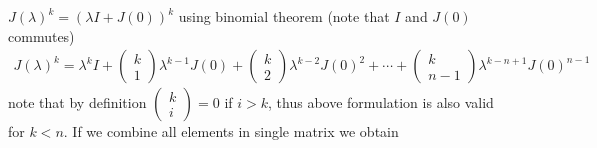 \documentclass[twoside]{article}
\begin{document}
$J(\lambda)^k = \left( \lambda I +  J(0)\right)^k$ using binomial theorem (note that $I$ and $J(0)$ commutes)
%
\begin{align*}
	J(\lambda)^k = \lambda^k I + \left( \begin{array}{c} k \\ 1 \end{array} \right) \lambda^{k-1} J(0) + 
	\left( \begin{array}{c} k \\ 2 \end{array} \right) \lambda^{k-2} J(0)^2 + \cdots + 
	\left( \begin{array}{c} k \\ n-1 \end{array} \right) \lambda^{k-n+1} J(0)^{n-1} 
\end{align*}
% 
note that by definition $\left( \begin{array}{c} k \\ i \end{array} \right) = 0 $ if $i > k$, thus above formulation is also valid for $k < n$. If we combine 
all elements in single matrix we obtain
%
\end{document}
